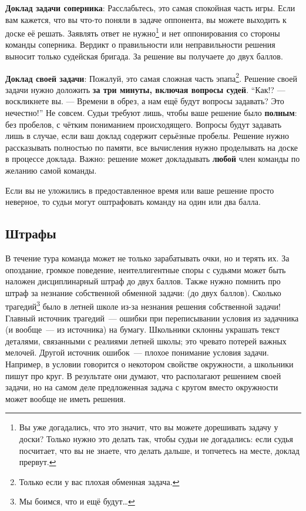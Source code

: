 \documentclass[12pt]{article}
\begin{document}
{\bf Доклад задачи соперника}: Расслабьтесь, это самая спокойная часть игры. Если вам кажется, что вы что-то поняли в задаче оппонента, вы можете выходить к доске её решать. Заявлять ответ не нужно\footnote{Вы уже догадались, что это значит, что вы можете дорешивать задачу у доски? Только нужно это делать так, чтобы судьи не догадались: если судья посчитает, что вы не знаете, что делать дальше, и топчетесь на месте, доклад прервут.} и нет оппонирования со стороны команды соперника. Вердикт о правильности или неправильности решения выносит только судейская бригада. За решение вы получаете до двух баллов.

{\bf Доклад своей задачи}: Пожалуй, это самая сложная часть эпапа\footnote{Только если у вас плохая обменная задача.}. Решение своей задачи нужно доложить {\bf за три минуты, включая вопросы судей}. ``Как!? --- воскликнете вы. --- Времени в обрез, а нам ещё будут вопросы задавать? Это нечестно!'' Не совсем. Судьи требуют лишь, чтобы ваше решение было {\bf полным}: без пробелов, с чётким пониманием происходящего. Вопросы будут задавать лишь в случае, если ваш доклад содержит серьёзные пробелы. Решение нужно рассказывать полностью по памяти, все вычисления нужно проделывать на доске в процессе доклада. Важно: решение может докладывать {\bf любой} член команды по желанию самой команды.

Если вы не уложились в предоставленное время или ваше решение просто неверное, то судьи могут оштрафовать команду на один или два балла.

\subsection*{Штрафы}
В течение тура команда может не только зарабатывать очки, но и терять их. За опоздание, громкое поведение, неителлигентные споры с судьями может быть наложен дисциплинарный штраф до двух баллов. Также нужно помнить про штраф за незнание собственной обменной задачи: (до двух баллов). Сколько трагедий\footnote{Мы боимся, что и ещё будут\ldots} было в летней школе из-за незнания решения собственной задачи! Главный источник трагедий~--- ошибки при переписывании условия из задачника (и вообще~--- из источника) на бумагу. Школьники склонны украшать текст деталями, связанными с реалиями летней школы; это чревато потерей важных мелочей. Другой источник ошибок~--- плохое понимание условия задачи. Например, в условии говорится о некотором свойстве окружности, а школьники пишут про круг. В результате они думают, что располагают решением своей задачи, но на самом деле предложенная задача с кругом вместо окружности может вообще не иметь решения.
\end{document}

